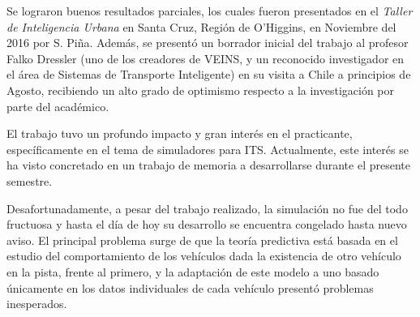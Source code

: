 \documentclass[11pt,letterpaper]{article}
\begin{document}
Se lograron buenos resultados parciales, los cuales fueron presentados en el \emph{Taller de Inteligencia Urbana} en Santa Cruz, Región de O'Higgins, en Noviembre del 2016 por S. Piña. Además, se presentó un borrador inicial del trabajo al profesor Falko Dressler (uno de los creadores de VEINS, y un reconocido investigador en el área de Sistemas de Transporte Inteligente) en su visita a Chile a principios de Agosto, recibiendo un alto grado de optimismo respecto a la investigación por parte del académico.

El trabajo tuvo un profundo impacto y gran interés en el practicante, específicamente en el tema de simuladores para ITS. Actualmente, este interés se ha visto concretado en un trabajo de memoria a desarrollarse durante el presente semestre.

Desafortunadamente, a pesar del trabajo realizado, la simulación no fue del todo fructuosa y hasta el día de hoy su desarrollo se encuentra congelado hasta nuevo aviso. El principal problema surge de que la teoría predictiva está basada en el estudio del comportamiento de los vehículos dada la existencia de otro vehículo en la pista, frente al primero, y la adaptación de este modelo a uno basado únicamente en los datos individuales de cada vehículo presentó problemas inesperados.
\end{document}
